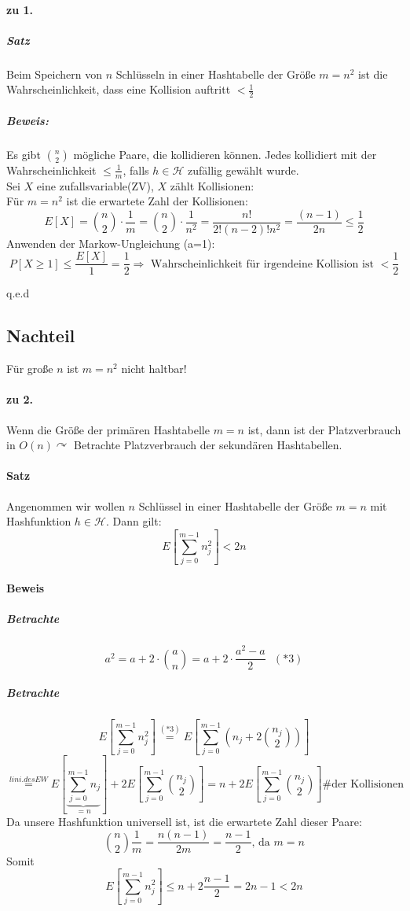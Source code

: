 \paragraph{zu 1.}
\subparagraph{Satz}
Beim Speichern von $n$ Schlüsseln in einer Hashtabelle der Größe $m=n^2$ ist die Wahrscheinlichkeit, dass eine Kollision auftritt $<\frac{1}{2}$
\subparagraph{Beweis:}
Es gibt $\binom{n}{2}$ mögliche Paare, die kollidieren können. Jedes kollidiert mit der Wahrscheinlichkeit $\leq \frac{1}{m}$, falls $h\in\mathcal{H}$ zufällig gewählt wurde.\\
Sei $X$ eine zufallsvariable(ZV), $X$ zählt Kollisionen:\\
Für $m=n^2$ ist die erwartete Zahl der Kollisionen:
\[ E[X]=\binom{n}{2}\cdot\frac{1}{m}=\binom{n}{2}\cdot\frac{1}{n^2}=\frac{n!}{2!(n-2)!n^2}=\frac{(n-1)}{2n}\leq\frac{1}{2} \]
Anwenden der Markow-Ungleichung (a=1):
\[ P[X\geq 1]\leq \frac{E[X]}{1}=\frac{1}{2} \Rightarrow \text{ Wahrscheinlichkeit für irgendeine Kollision ist } <\frac{1}{2} \]
\begin{flushright}
	q.e.d
	\end{flushright}
\subsection{Nachteil}
Für große $n$ ist $m=n^2$ nicht haltbar!
\paragraph{zu 2.}
Wenn die Größe der primären Hashtabelle $m=n$ ist, dann ist der Platzverbrauch in $O(n) \curvearrowright$ Betrachte Platzverbrauch der sekundären Hashtabellen.
\paragraph{Satz}
Angenommen wir wollen $n$ Schlüssel in einer Hashtabelle der Größe $m=n$ mit Hashfunktion $h\in \mathcal{H}$. Dann gilt:
\[ E\left[ \sum_{j=0}^{m-1} n_j^2 \right] <2n\]
\paragraph{Beweis}
\subparagraph{Betrachte}
\[ a^2= a+2\cdot\binom{a}{n}=a+2\cdot\frac{a^2-a}{2}~~~(*3) \]
\subparagraph{Betrachte}
\[ E\left[ \sum_{j=0}^{m-1} n_j^2\right] \overset{(*3)}{=} E \left[ \sum_{j=0}^{m-1} \left(n_j+2\binom{n_j}{2}\right) \right] \]
\[ \overset{lini. des EW}{=} E \left[ \underset{=n}{\underbrace{\sum_{j=0}^{m-1}n_j}} \right]+2E\left[ \sum_{j=0}^{m-1}\binom{n_j}{2} \right]=n+2E\left[ \sum_{j=0}^{m-1} \binom{n_j}{2}\right] \text{\# der Kollisionen}\]
Da unsere Hashfunktion universell ist, ist die erwartete Zahl dieser Paare:
\[ \binom{n}{2}\frac{1}{m}=\frac{n(n-1)}{2m}=\frac{n-1}{2}\text{, da }m=n \]
Somit
\[ E\left[ \sum_{j=0}^{m-1} n_j^2\right] \leq n+2\frac{n-1}{2}=2n-1<2n \]
